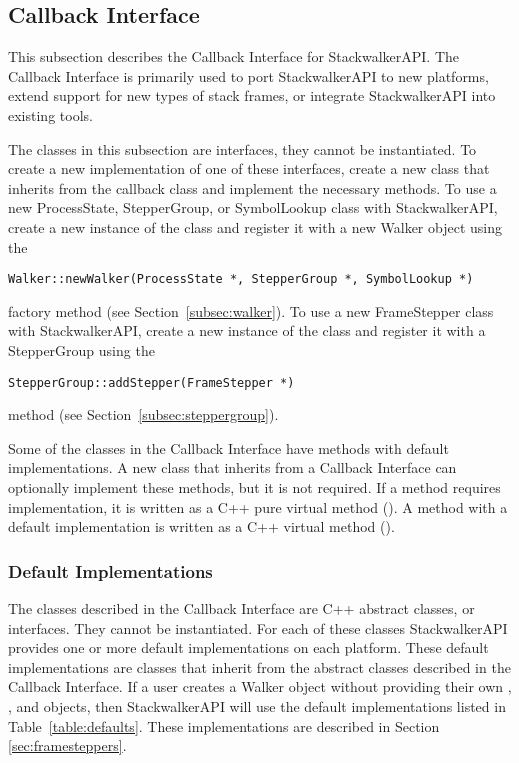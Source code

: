 \subsection{Callback Interface}
\label{sec:callback-interface}
This subsection describes the Callback Interface for StackwalkerAPI. The
Callback Interface is primarily used to port StackwalkerAPI to new platforms,
extend support for new types of stack frames, or integrate StackwalkerAPI into
existing tools.

The classes in this subsection are interfaces, they cannot be instantiated.  To
create a new implementation of one of these interfaces, create a new class that
inherits from the callback class and implement the necessary methods. To use a
new ProcessState, StepperGroup, or SymbolLookup class with StackwalkerAPI,
create a new instance of the class and register it with a new Walker object
using the
\begin{lstlisting}
Walker::newWalker(ProcessState *, StepperGroup *, SymbolLookup *)
\end{lstlisting}	
factory method (see Section~\ref{subsec:walker}). To use a new FrameStepper class with
StackwalkerAPI, create a new instance of the class and register it with a
StepperGroup using the
\begin{lstlisting}
StepperGroup::addStepper(FrameStepper *)
\end{lstlisting}
method (see Section~\ref{subsec:steppergroup}).

Some of the classes in the Callback Interface have methods with default
implementations. A new class that inherits from a Callback Interface can
optionally implement these methods, but it is not required. If a method requires
implementation, it is written as a C++ pure virtual method (). A method with a default implementation is written as a C++ virtual method
().

\subsubsection{Default Implementations}
\label{subsec:defaults}

The classes described in the Callback Interface are C++ abstract classes, or
interfaces. They cannot be instantiated. For each of these classes
StackwalkerAPI provides one or more default implementations on each platform.
These default implementations are classes that inherit from the abstract classes
described in the Callback Interface. If a user creates a Walker object without
providing their own , , and
 objects, then StackwalkerAPI will use the default
implementations listed in Table~\ref{table:defaults}. These
implementations are described in Section \ref{sec:framesteppers}.

